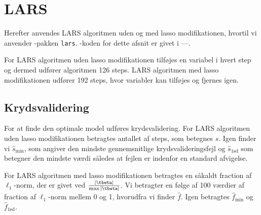 \section{LARS}
Herefter anvendes LARS algoritmen uden og med lasso modifikationen, hvortil vi anvender \Rlang-pakken \texttt{lars}.
\Rlang-koden for dette afsnit er givet i ---.

For LARS algoritmen uden lasso modifikationen tilføjes en variabel i hvert step og dermed udfører algoritmen 126 steps.
LARS algoritmen med lasso modifikationen udfører 192 steps, hvor variabler kan tilføjes og fjernes igen.

\subsection{Krydsvalidering}
For at finde den optimale model udføres krydsvalidering.
For LARS algoritmen uden lasso modifikationen betragtes antallet af steps, som betegnes \(s\). 
Igen finder vi $\widehat{s}_{\min}$, som angiver den mindste gennemsnitlige krydsvalideringsfejl og $\widehat{s}_{\text{1sd}}$ som betegner den mindste værdi således at fejlen er indenfor en standard afvigelse. 

For LARS algoritmen med lasso modifikationen betragtes en såkaldt fraction af \(\ell_1\)-norm, der er givet ved \(\frac{\vert \tbeta \vert}{\max \vert \tbeta \vert}\).
Vi betragter en følge af 100 værdier af fraction af \(\ell_1\)-norm mellem 0 og 1, hvorudfra vi finder $\widehat{f}$.
Igen betragtes \(\widehat{f}_{\min}\) og \(\widehat{f}_{\text{1sd}}\).



